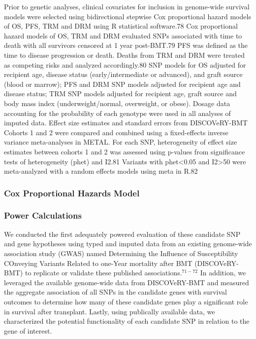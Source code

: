 \documentclass[]{DissertateUSU}
\begin{document}
Prior to genetic analyses, clinical covariates for inclusion in
genome-wide survival models were selected using bidirectional stepwise
Cox proportional hazard models of OS, PFS, TRM and DRM using R
statistical software.78 Cox proportional hazard models of OS, TRM and
DRM evaluated SNPs associated with time to death with all survivors
censored at 1 year post-BMT.79 PFS was defined as the time to disease
progression or death. Deaths from TRM and DRM were treated as competing
risks and analyzed accordingly.80 SNP models for OS adjusted for
recipient age, disease status (early/intermediate or advanced), and
graft source (blood or marrow); PFS and DRM SNP models adjusted for
recipient age and disease status; TRM SNP models adjusted for recipient
age, graft source and body mass index (underweight/normal, overweight,
or obese). Dosage data accounting for the probability of each genotype
were used in all analyses of imputed data. Effect size estimates and
standard errors from DISCOVeRY-BMT Cohorts 1 and 2 were compared and
combined using a fixed-effects inverse variance meta-analyses in METAL.
For each SNP, heterogeneity of effect size estimates between cohorts 1
and 2 was assessed using p-values from significance tests of
heterogeneity (phet) and I2.81 Variants with phet\textless{}0.05 and
I2\textgreater{}50 were meta-analyzed with a random effects models using
meta in R.82

\subsubsection{Cox Proportional Hazards
Model}\label{cox-proportional-hazards-model}

\subsubsection{Power Calculations}\label{power-calculations}

We conducted the first adequately powered evaluation of these candidate
SNP and gene hypotheses using typed and imputed data from an existing
genome-wide association study (GWAS) named Determining the Influence of
Susceptibility COnveying Variants Related to one-Year mortality after
BMT (DISCOVeRY-BMT) to replicate or validate these published
associations.\(^{71-72}\) In addition, we leveraged the available
genome-wide data from DISCOVeRY-BMT and measured the aggregate
association of all SNPs in the candidate genes with survival outcomes to
determine how many of these candidate genes play a significant role in
survival after transplant. Lastly, using publically available data, we
characterized the potential functionality of each candidate SNP in
relation to the gene of interest.
\end{document}
